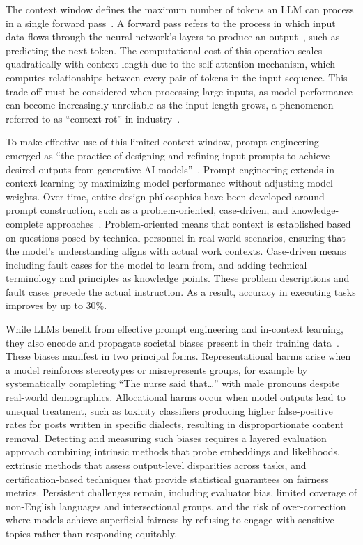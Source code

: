 \documentclass[
english,                 %
bibtex,                  %
includeExtraAbstracts, %
]{kththesis}
\numberwithin{listing}{chapter}
\begin{document}
The context window defines the maximum number of tokens an \gls{LLM} can process in a single forward pass~\cite{ratner_parallel_2023}. A forward pass refers to the process in which input data flows through the neural network's layers to produce an output~\cite{schmidhuber_deep_2015}, such as predicting the next token. The computational cost of this operation scales quadratically with context length due to the self-attention mechanism, which computes relationships between every pair of tokens in the input sequence. This trade-off must be considered when processing large inputs, as model performance can become increasingly unreliable as the input length grows, a phenomenon referred to as ``context rot'' in industry~\cite{hong_context_2025}.

To make effective use of this limited context window, prompt engineering emerged as ``the practice of designing and refining input prompts to achieve desired outputs from generative \gls{AI} models''~\cite{cinar_prompt_2026}. Prompt engineering extends in-context learning by maximizing model performance without adjusting model weights. Over time, entire design philosophies have been developed around prompt construction, such as a problem-oriented, case-driven, and knowledge-complete approaches~\cite{wu_improving_2025}. Problem-oriented means that context is established based on questions posed by technical personnel in real-world scenarios, ensuring that the model's understanding aligns with actual work contexts. Case-driven means including fault cases for the model to learn from, and adding technical terminology and principles as knowledge points. These problem descriptions and fault cases precede the actual instruction. As a result, accuracy in executing tasks improves by up to 30\%.

While \glspl{LLM} benefit from effective prompt engineering and in-context learning, they also encode and propagate societal biases present in their training data~\cite{gao_detecting_2026}. These biases manifest in two principal forms. Representational harms arise when a model reinforces stereotypes or misrepresents groups, for example by systematically completing ``The nurse said that\ldots'' with male pronouns despite real-world demographics. Allocational harms occur when model outputs lead to unequal treatment, such as toxicity classifiers producing higher false-positive rates for posts written in specific dialects, resulting in disproportionate content removal. Detecting and measuring such biases requires a layered evaluation approach combining intrinsic methods that probe embeddings and likelihoods, extrinsic methods that assess output-level disparities across tasks, and certification-based techniques that provide statistical guarantees on fairness metrics. Persistent challenges remain, including evaluator bias, limited coverage of non-English languages and intersectional groups, and the risk of over-correction where models achieve superficial fairness by refusing to engage with sensitive topics rather than responding equitably.
\end{document}
